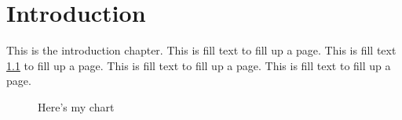 \chapter{Introduction}
\label{ch:intro:introduction}

This is the introduction chapter.
This is fill text to fill up a page.
This is fill text \ref{fig:my_cool_chart} to fill up a page.
This is fill text to fill up a page.
This is fill text to fill up a page.


\begin{figure}[!ht]
\centering
{}

  \caption{Here's my chart \label{fig:my_cool_chart}}

\end{figure}